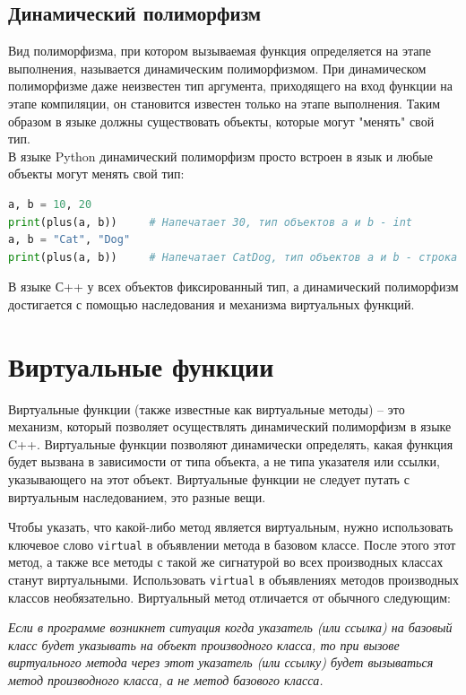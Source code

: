\documentclass{article}
\begin{document}
\subsection*{Динамический полиморфизм}
Вид полиморфизма, при котором вызываемая функция определяется на этапе выполнения, называется динамическим полиморфизмом. При динамическом полиморфизме даже неизвестен тип аргумента, приходящего на вход функции на этапе компиляции, он становится известен только на этапе выполнения. Таким образом в языке должны существовать объекты, которые могут "менять"{} свой тип.\\
В языке Python динамический полиморфизм просто встроен в язык и любые объекты могут менять свой тип:
\begin{lstlisting}[language=Python]
a, b = 10, 20
print(plus(a, b))     # Напечатает 30, тип объектов a и b - int
a, b = "Cat", "Dog"
print(plus(a, b))     # Напечатает CatDog, тип объектов a и b - строка
\end{lstlisting}
В языке С++ у всех объектов фиксированный тип, а динамический полиморфизм достигается с помощью наследования и механизма виртуальных функций.

\newpage
\section*{Виртуальные функции}
Виртуальные функции (также известные как виртуальные методы) -- это механизм, который позволяет осуществлять динамический полиморфизм в языке C++.
Виртуальные функции позволяют динамически определять, какая функция будет вызвана в зависимости от типа объекта, а не типа указателя или ссылки, указывающего на этот объект.
Виртуальные функции не следует путать с виртуальным наследованием, это разные вещи.

Чтобы указать, что какой-либо метод является виртуальным, нужно использовать ключевое слово \texttt{virtual} в объявлении метода в базовом классе. После этого этот метод, а также все методы с такой же сигнатурой во всех производных классах станут виртуальными. Использовать \texttt{virtual} в объявлениях методов производных классов необязательно. Виртуальный метод отличается от обычного следующим:

\begin{center}
\textit{Если в программе возникнет ситуация когда указатель (или ссылка) на базовый класс будет указывать на объект производного класса, то при вызове виртуального метода через этот указатель (или ссылку) будет вызываться метод производного класса, а не метод базового класса.}
\end{center}
\end{document}
